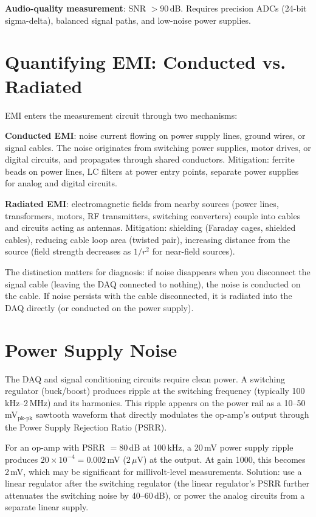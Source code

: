 \documentclass[11pt,letterpaper,twoside,openany]{book}
\begin{document}
\textbf{Audio-quality measurement}: SNR $> 90$\,dB. Requires precision ADCs (24-bit sigma-delta), balanced signal paths, and low-noise power supplies.
\section{Quantifying EMI: Conducted vs. Radiated}
EMI enters the measurement circuit through two mechanisms:

\textbf{Conducted EMI}: noise current flowing on power supply lines, ground wires, or signal cables. The noise originates from switching power supplies, motor drives, or digital circuits, and propagates through shared conductors. Mitigation: ferrite beads on power lines, LC filters at power entry points, separate power supplies for analog and digital circuits.

\textbf{Radiated EMI}: electromagnetic fields from nearby sources (power lines, transformers, motors, RF transmitters, switching converters) couple into cables and circuits acting as antennas. Mitigation: shielding (Faraday cages, shielded cables), reducing cable loop area (twisted pair), increasing distance from the source (field strength decreases as $1/r^2$ for near-field sources).

The distinction matters for diagnosis: if noise disappears when you disconnect the signal cable (leaving the DAQ connected to nothing), the noise is conducted on the cable. If noise persists with the cable disconnected, it is radiated into the DAQ directly (or conducted on the power supply).

\section{Power Supply Noise}
The DAQ and signal conditioning circuits require clean power. A switching regulator (buck/boost) produces ripple at the switching frequency (typically 100\,kHz--2\,MHz) and its harmonics. This ripple appears on the power rail as a 10--50\,mV$_{\text{pk-pk}}$ sawtooth waveform that directly modulates the op-amp's output through the Power Supply Rejection Ratio (PSRR).

For an op-amp with PSRR $= 80$\,dB at 100\,kHz, a 20\,mV power supply ripple produces $20 \times 10^{-4} = 0.002$\,mV ($2\,\mu$V) at the output. At gain 1000, this becomes 2\,mV, which may be significant for millivolt-level measurements. Solution: use a linear regulator after the switching regulator (the linear regulator's PSRR further attenuates the switching noise by 40--60\,dB), or power the analog circuits from a separate linear supply.
\end{document}
